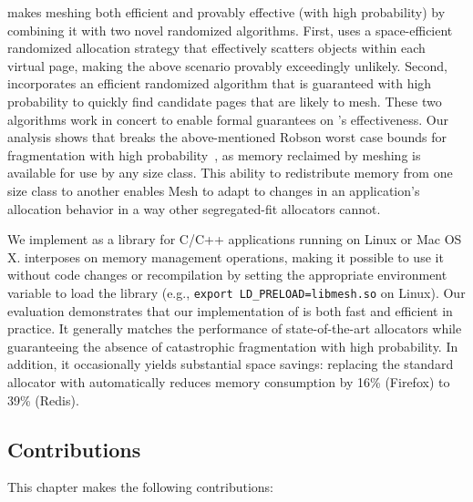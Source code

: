 \Mesh makes meshing both efficient and provably effective (with high
probability) by combining it with two novel randomized
algorithms. First, \Mesh uses a space-efficient randomized
allocation strategy that effectively scatters objects within each
virtual page, making the above scenario provably exceedingly
unlikely. Second, \Mesh incorporates an efficient randomized
algorithm that is guaranteed with high probability to quickly find
candidate pages that are likely to mesh. These two algorithms work in
concert to enable formal guarantees on \Mesh's effectiveness. Our
analysis shows that \Mesh breaks the above-mentioned Robson worst
case bounds for fragmentation with high
probability~\cite{robson:1977:worstcasefrag}, as memory reclaimed by meshing is available for use by any size class.
This ability to redistribute memory from one size class to another enables Mesh to adapt to changes in an application's allocation behavior in a way other segregated-fit allocators cannot.


We implement \Mesh as a library for C/C++ applications running on
Linux or Mac OS X. \Mesh{} interposes on memory management operations,
making it possible to use it without code changes or
recompilation by setting the appropriate environment variable to load
the \Mesh{} library (e.g., \texttt{export
  LD\_PRELOAD=libmesh.so} on Linux). Our evaluation demonstrates that
our implementation of \Mesh{} is both fast and efficient in
practice. It generally matches the performance of state-of-the-art
allocators while guaranteeing the absence of catastrophic
fragmentation with high probability. In addition, it occasionally
yields substantial space savings: replacing the standard allocator
with \Mesh{} automatically reduces memory consumption by 16\%
(Firefox) to 39\% (Redis).


\subsection{Contributions}
\label{sec:contributions}

This chapter makes the following contributions:

